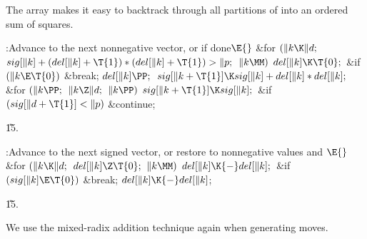 The  array makes it easy to backtrack through all partitions
of  into an ordered sum of squares.

\Y\B\4:Advance to the next nonnegative  vector, or  if done\X${}\E{}$\6
\&{for} ${}(\|k\K\|d;{}$ ${}\\{sig}[\|k]+(\\{del}[\|k]+\T{1})*(\\{del}[\|k]+%
\T{1})>\|p;{}$ ${}\|k\MM){}$\1\5
${}\\{del}[\|k]\K\T{0};{}$\2\6
\&{if} ${}(\|k\E\T{0}){}$\1\5
\&{break};\2\6
${}\\{del}[\|k]\PP;{}$\6
${}\\{sig}[\|k+\T{1}]\K\\{sig}[\|k]+\\{del}[\|k]*\\{del}[\|k];{}$\6
\&{for} ${}(\|k\PP;{}$ ${}\|k\Z\|d;{}$ ${}\|k\PP){}$\1\5
${}\\{sig}[\|k+\T{1}]\K\\{sig}[\|k];{}$\2\6
\&{if} ${}(\\{sig}[\|d+\T{1}]<\|p){}$\1\5
\&{continue};\2\par
\U15.\fi

\B{}:Advance to the next signed  vector, or restore  to nonnegative values and \X${}\E{}$\6
\&{for} ${}(\|k\K\|d;{}$ ${}\\{del}[\|k]\Z\T{0};{}$ ${}\|k\MM){}$\1\5
${}\\{del}[\|k]\K{-}\\{del}[\|k];{}$\2\6
\&{if} ${}(\\{sig}[\|k]\E\T{0}){}$\1\5
\&{break};\2\6
${}\\{del}[\|k]\K{-}\\{del}[\|k]{}$;\par
\U15.\fi

We use the mixed-radix addition technique again when generating moves.

